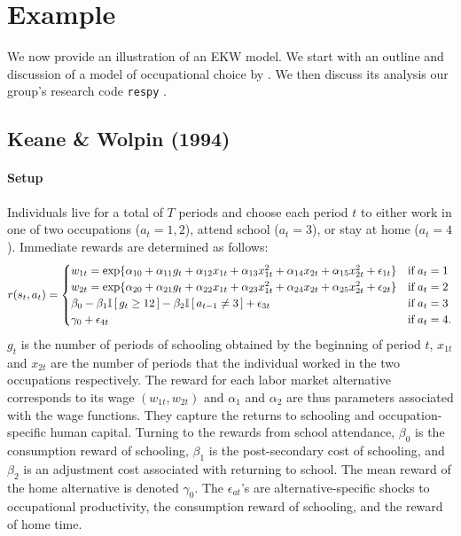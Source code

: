 \section{Example}\label{Example}
We now provide an illustration of an EKW model. We start with an outline and discussion of a model of occupational choice by \citet{Keane.1994}. We then discuss its analysis our group's research code \verb+respy+ \citep{respy-1.0}.
\subsection{Keane \& Wolpin (1994)}
\paragraph{Setup} Individuals live for a total of $T$ periods and choose each period $t$ to either work in one of two occupations ($a_t = 1, 2$), attend school ($a_t = 3$), or stay at home ($a_t = 4$). Immediate rewards are determined as follows:
%
\begin{align*}
r(s_t, a_t) = \begin{cases} w_{1t} =
\exp\{\alpha_{10} + \alpha_{11}g_t + \alpha_{12}x_{1t} + \alpha_{13}x^2_{1t} + \alpha_{14}x_{2t} + \alpha_{15}x^2_{2t} + \epsilon_{1t}\} & \text{if}\; a_t = 1 \\
w_{2t} = \exp\{\alpha_{20} + \alpha_{21}g_t + \alpha_{22}x_{1t} + \alpha_{23}x^2_{1t} + \alpha_{24}x_{2t} + \alpha_{25}x^2_{2t} + \epsilon_{2t}\}& \text{if}\; a_t = 2 \\
\beta_0 - \beta_1 \mathbb{I}\,[\,g_t \geq 12\,] - \beta_2\mathbb{I}\,[\,a_{t - 1} \neq 3\,] + \epsilon_{3t}& \text{if}\; a_t = 3 \\
\gamma_0 + \epsilon_{4t}& \text{if}\; a_t = 4. \\
\end{cases}
\end{align*}
%
$g_t$ is the number of periods of schooling obtained by the beginning of period $t$, $x_{1t}$ and $x_{2t}$ are the number of periods that the individual worked in the two occupations respectively. The reward for each labor market alternative corresponds to its wage $(w_{1t}, w_{2t})$ and $\alpha_{1}$ and $\alpha_{2}$ are thus parameters associated with the wage functions. They capture the returns to schooling and occupation-specific human capital. Turning to the rewards from school attendance, $\beta_0$ is the consumption reward of schooling, $\beta_1$ is the post-secondary cost of schooling, and $\beta_2$ is an adjustment cost associated with returning to school. The mean reward of the home alternative is denoted $\gamma_0$. The $\epsilon_{at}$'s are alternative-specific shocks to occupational productivity, the consumption reward of schooling, and the reward of home time.\\

